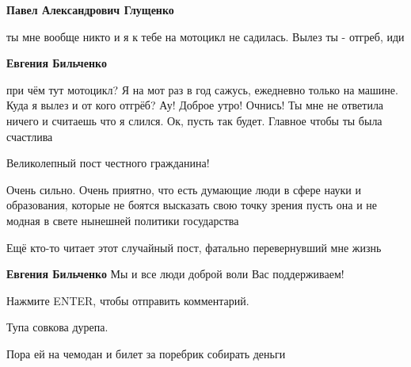 \begin{itemize}
\begin{itemize}

\textbf{Павел Александрович Глущенко} 

ты мне вообще никто и я к тебе на мотоцикл не садилась. Вылез ты - отгреб, иди


\textbf{Евгения Бильченко} 

при чём тут мотоцикл? Я на мот раз в год сажусь, ежедневно только на машине.
Куда я вылез и от кого отгрёб? Ау! Доброе утро! Очнись! Ты мне не ответила
ничего и считаешь что я слился. Ок, пусть так будет. Главное чтобы ты была
счастлива
\end{itemize}


Великолепный пост честного гражданина!


Очень сильно. Очень приятно, что есть думающие люди в сфере науки и образования, которые не боятся высказать свою точку зрения пусть она и не модная в свете нынешней политики государства


Ещё кто-то читает этот случайный пост, фатально перевернувший мне жизнь


\textbf{Евгения Бильченко} Мы и все люди доброй воли Вас поддерживаем!


Нажмите ENTER, чтобы отправить комментарий.

Тупа совкова дурепа.


Пора ей на чемодан и билет за поребрик собирать деньги


\end{itemize}


